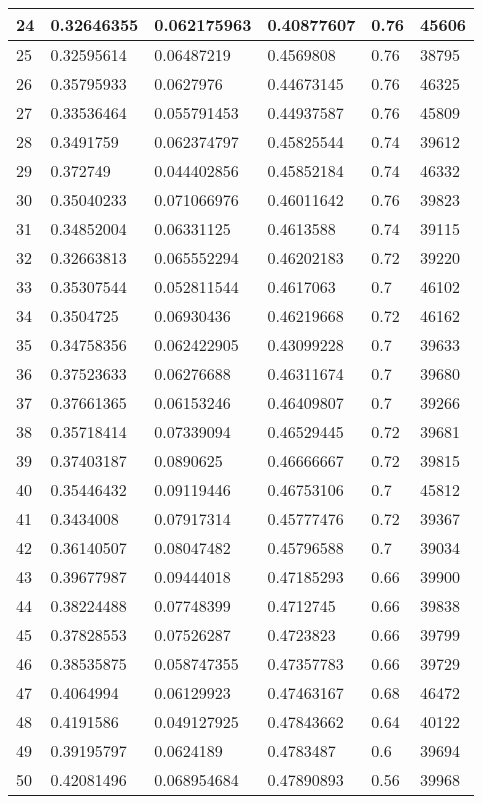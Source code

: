 \begin{longtable}{|l|l|l|l|l|l|}
24 & 0.32646355 & 0.062175963 & 0.40877607 & 0.76 & 45606 \\ \hline 
25 & 0.32595614 & 0.06487219 & 0.4569808 & 0.76 & 38795 \\ \hline 
26 & 0.35795933 & 0.0627976 & 0.44673145 & 0.76 & 46325 \\ \hline 
27 & 0.33536464 & 0.055791453 & 0.44937587 & 0.76 & 45809 \\ \hline 
28 & 0.3491759 & 0.062374797 & 0.45825544 & 0.74 & 39612 \\ \hline 
29 & 0.372749 & 0.044402856 & 0.45852184 & 0.74 & 46332 \\ \hline 
30 & 0.35040233 & 0.071066976 & 0.46011642 & 0.76 & 39823 \\ \hline 
31 & 0.34852004 & 0.06331125 & 0.4613588 & 0.74 & 39115 \\ \hline 
32 & 0.32663813 & 0.065552294 & 0.46202183 & 0.72 & 39220 \\ \hline 
33 & 0.35307544 & 0.052811544 & 0.4617063 & 0.7 & 46102 \\ \hline 
34 & 0.3504725 & 0.06930436 & 0.46219668 & 0.72 & 46162 \\ \hline 
35 & 0.34758356 & 0.062422905 & 0.43099228 & 0.7 & 39633 \\ \hline 
36 & 0.37523633 & 0.06276688 & 0.46311674 & 0.7 & 39680 \\ \hline 
37 & 0.37661365 & 0.06153246 & 0.46409807 & 0.7 & 39266 \\ \hline 
38 & 0.35718414 & 0.07339094 & 0.46529445 & 0.72 & 39681 \\ \hline 
39 & 0.37403187 & 0.0890625 & 0.46666667 & 0.72 & 39815 \\ \hline 
40 & 0.35446432 & 0.09119446 & 0.46753106 & 0.7 & 45812 \\ \hline 
41 & 0.3434008 & 0.07917314 & 0.45777476 & 0.72 & 39367 \\ \hline 
42 & 0.36140507 & 0.08047482 & 0.45796588 & 0.7 & 39034 \\ \hline 
43 & 0.39677987 & 0.09444018 & 0.47185293 & 0.66 & 39900 \\ \hline 
44 & 0.38224488 & 0.07748399 & 0.4712745 & 0.66 & 39838 \\ \hline 
45 & 0.37828553 & 0.07526287 & 0.4723823 & 0.66 & 39799 \\ \hline 
46 & 0.38535875 & 0.058747355 & 0.47357783 & 0.66 & 39729 \\ \hline 
47 & 0.4064994 & 0.06129923 & 0.47463167 & 0.68 & 46472 \\ \hline 
48 & 0.4191586 & 0.049127925 & 0.47843662 & 0.64 & 40122 \\ \hline 
49 & 0.39195797 & 0.0624189 & 0.4783487 & 0.6 & 39694 \\ \hline 
50 & 0.42081496 & 0.068954684 & 0.47890893 & 0.56 & 39968 \\ \hline 
\end{longtable}